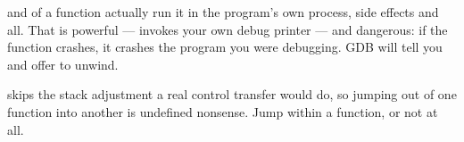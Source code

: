 \begin{note}
	 and  of a function actually run it in the program's own
	process, side effects and all. That is powerful --- 
	invokes your own debug printer --- and dangerous: if the function crashes, it
	crashes the program you were debugging. GDB will tell you and offer to unwind.
\end{note}

\begin{moral}
	 skips the stack adjustment a real control transfer would do, so
	jumping out of one function into another is undefined nonsense. Jump within a
	function, or not at all.
\end{moral}
